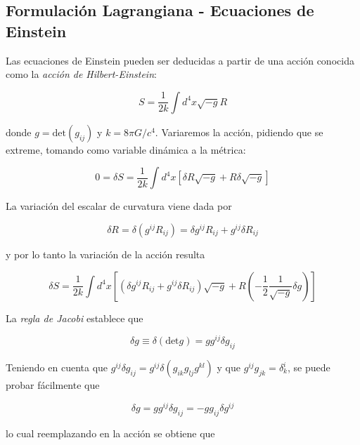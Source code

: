 

\subsection{Formulación Lagrangiana - Ecuaciones de Einstein}\label{EH action}

Las ecuaciones de Einstein pueden ser deducidas a partir de una acción conocida como la \textit{acción de Hilbert-Einstein}:

\begin{equation*}
    S=\frac{1}{2k}\int d^4x\sqrt{-g}R
\end{equation*}

donde $g=\text{det}(g_{ij})$ y $k=8\pi G/c^4$. Variaremos la acción, pidiendo que se extreme, tomando como variable dinámica a la métrica:

\begin{equation*}
    0=\delta S=\frac{1}{2k}\int d^4x[\delta R\sqrt{-g}+R\delta\sqrt{-g}]
\end{equation*}

La variación del escalar de curvatura viene dada por

\begin{equation*}
    \delta R=\delta (g^{ij}R_{ij})=\delta g^{ij} R_{ij}+g^{ij}\delta R_{ij}
\end{equation*}

y por lo tanto la variación de la acción resulta 

\begin{equation*}
    \delta S=\frac{1}{2k}\int d^4x\left[(\delta g^{ij} R_{ij}+g^{ij}\delta R_{ij})\sqrt{-g}+R\left(-\frac{1}{2}\frac{1}{\sqrt{-g}}\delta g   \right)   \right]
\end{equation*}

La \textit{regla de Jacobi} establece que 

\begin{equation*}
    \delta g \equiv \delta (\text{det}g)=gg^{ij}\delta g_{ij}
\end{equation*}

Teniendo en cuenta que $g^{ij}\delta g_{ij}=g^{ij}\delta (g_{ik}g_{lj}g^{kl})$ y que $g^{ij}g_{jk}=\delta ^i_k$, se puede probar fácilmente que

\begin{equation*}
    \delta g=gg^{ij}\delta g_{ij}=-gg_{ij}\delta g^{ij}
\end{equation*}

lo cual reemplazando en la acción se obtiene que

